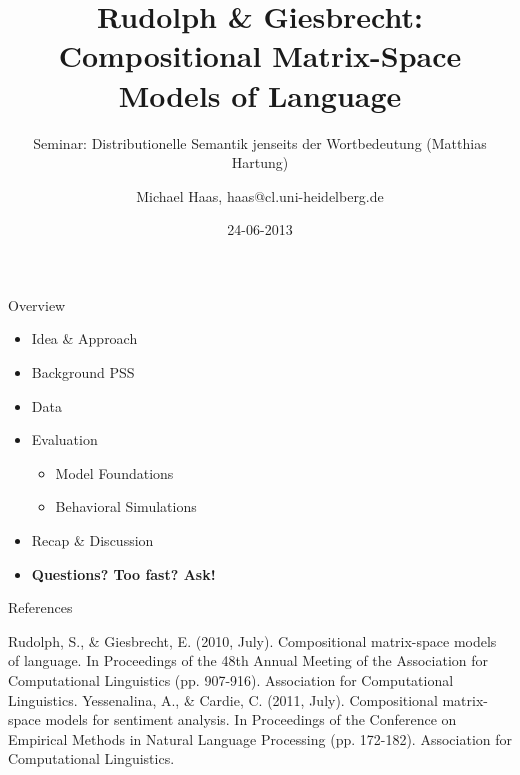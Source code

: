 \documentclass[12pt,a4paper]{beamer}
\author{Michael Haas, haas@cl.uni-heidelberg.de}
\title{Rudolph \& Giesbrecht: Compositional Matrix-Space Models of Language}
\subtitle{Seminar: Distributionelle Semantik jenseits der Wortbedeutung (Matthias Hartung)}
\date{24-06-2013}
\begin{document}
\begin{frame}
\maketitle
\end{frame}

\begin{frame}{Overview}
\begin{itemize}
\item Idea \& Approach %
\item Background PSS
\item Data
\item Evaluation
    \begin{itemize}
    \item Model Foundations
    \item Behavioral Simulations
    \end{itemize}
\item Recap \& Discussion
\item \textbf{Questions? Too fast? Ask!}
\end{itemize}
\end{frame}



\begin{frame}[allowframebreaks]{References}
\begin{thebibliography}{-}
 Rudolph, S., \& Giesbrecht, E. (2010, July). Compositional matrix-space models of language. In Proceedings of the 48th Annual Meeting of the Association for Computational Linguistics (pp. 907-916). Association for Computational Linguistics.
 Yessenalina, A., \& Cardie, C. (2011, July). Compositional matrix-space models for sentiment analysis. In Proceedings of the Conference on Empirical Methods in Natural Language Processing (pp. 172-182). Association for Computational Linguistics.
\end{thebibliography}
\end{frame}
\end{document}
